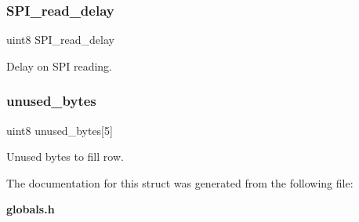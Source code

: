 \subsubsection{S\+P\+I\+\_\+read\+\_\+delay}
{\footnotesize\ttfamily uint8 S\+P\+I\+\_\+read\+\_\+delay}

Delay on S\+PI reading. \mbox{\label{structst__imu_a13769793684b23af8c0cdf6ccf3bd696}} 
\subsubsection{unused\+\_\+bytes}
{\footnotesize\ttfamily uint8 unused\+\_\+bytes[5]}

Unused bytes to fill row. 

The documentation for this struct was generated from the following file\+:\begin{DoxyCompactItemize}
\item 
\textbf{ globals.\+h}\end{DoxyCompactItemize}
